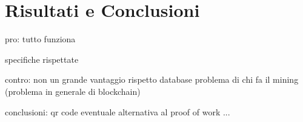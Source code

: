 \chapter*{Risultati e Conclusioni}

pro:
tutto funziona

specifiche rispettate

contro:
non un grande vantaggio rispetto database
problema di chi fa il mining (problema in generale di blockchain)

conclusioni:
qr code
eventuale alternativa al proof of work
...